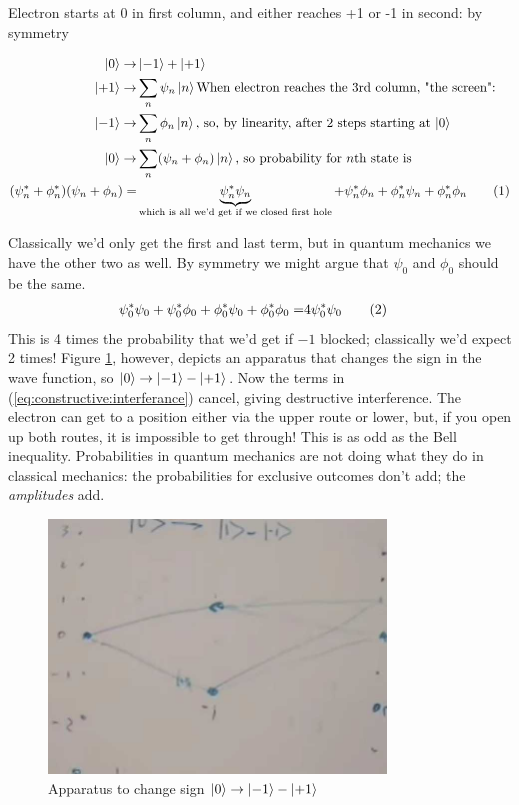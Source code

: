 \documentclass[]{article}
\newcommand\numberthis{\addtocounter{equation}{1}\tag{\theequation}}
\begin{document}
Electron starts at 0 in first column, and either reaches +1 or -1 in second: by symmetry

\begin{align*}
	\ket{0} \rightarrow& \ket{-1} + \ket{+1}\\
	\ket{+1} \rightarrow& \sum_n \psi_n \ket{n} \text{When electron reaches the 3rd column, "the screen":} \\
	\ket{-1} \rightarrow& \sum_n \phi_n \ket{n} \text{, so, by linearity, after 2 steps starting at $\ket{0}$}\\
	\ket{0} \rightarrow& \sum_n (\psi_n + \phi_n) \ket{n} \text{, so probability for $n$th state is}\\
	(\psi_n^* + \phi_n^*)(\psi_n + \phi_n)=& \underbrace{\psi_n^*\psi_n}_\text{which is all we'd get if we closed first hole} + \psi_n^*\phi_n + \phi_n^*\psi_n + \phi_n^*\phi_n \numberthis \label{eq:P:hole0}
\end{align*}

Classically we'd only get the first and last term, but in quantum mechanics we have the other two as well. By symmetry we might argue that $\psi_0$ and $\phi_0$ should be the same.
\begin{align*}
	\psi_0^*\psi_0 + \psi_0^*\phi_0 + \phi_0^*\psi_0 + \phi_0^*\phi_0 =& 4\psi_0^*\psi_0\numberthis \label{eq:constructive:interferance}
\end{align*}
This is 4 times the probability that we'd get if $-1$ blocked; classically we'd expect 2 times!
Figure \ref{fig:change:sign}, however,  depicts an apparatus that changes the sign in the wave function, so  $\ket{0} \rightarrow \ket{-1} - \ket{+1}$. Now the terms in (\ref{eq:constructive:interferance}) cancel, giving destructive interference. The electron can get to a position either via the upper route or lower, but, if you open up both routes, it is impossible to get through! This is as odd as the Bell inequality. Probabilities in quantum mechanics are not doing what they do in classical mechanics: the probabilities for exclusive outcomes don't add; the \emph{amplitudes} add.

\begin{figure}[H]
	\begin{center}
		\caption{Apparatus to change sign $\ket{0} \rightarrow \ket{-1} - \ket{+1}$}\label{fig:change:sign}
		\includegraphics[width=0.8\textwidth]{ent-2-slit-change-sign}
	\end{center}
\end{figure}
\end{document}
